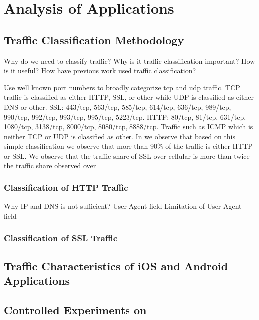 \section{Analysis of Applications}
\label{sec:classification}





\subsection{Traffic Classification Methodology}

Why do we need to classify traffic?
Why is it traffic classification important?
How is it useful?
How have previous work used traffic classification?

Use well known port numbers to broadly categorize tcp and udp traffic. 
TCP traffic is classified as either HTTP, SSL, or other while UDP is classified as either DNS or other. 
SSL: 443/tcp, 563/tcp, 585/tcp, 614/tcp, 636/tcp, 989/tcp, 990/tcp, 992/tcp, 993/tcp, 995/tcp, 5223/tcp.
HTTP:  80/tcp, 81/tcp, 631/tcp, 1080/tcp, 3138/tcp, 8000/tcp, 8080/tcp, 8888/tcp.
Traffic such as ICMP which is neither TCP or UDP is classified as other. 
In  we observe that based on this simple classification we observe that more than 90\% of the traffic is either HTTP or SSL.
We observe that the traffic share of SSL over cellular is more than twice the traffic share observed over \wifi  

\subsubsection{Classification of HTTP Traffic}

Why IP and DNS is not sufficient?
User-Agent field 
Limitation of User-Agent field 


\subsubsection{Classification of SSL Traffic}

\subsection{Traffic Characteristics of iOS and Android Applications}


\subsection{Controlled Experiments on }



